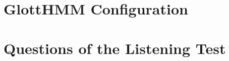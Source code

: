 \documentclass[12pt,a4paper]{article}
\begin{document}
\newpage
\tableofcontents

\newpage
\listoffigures

\newpage
\listoftables
\newpage











\clearpage





\appendix 
\clearpage
\section{GlottHMM Configuration}
\label{glott_conf}


\newpage
\section{Questions of the Listening Test}
\label{test_questions}

\end{document}
